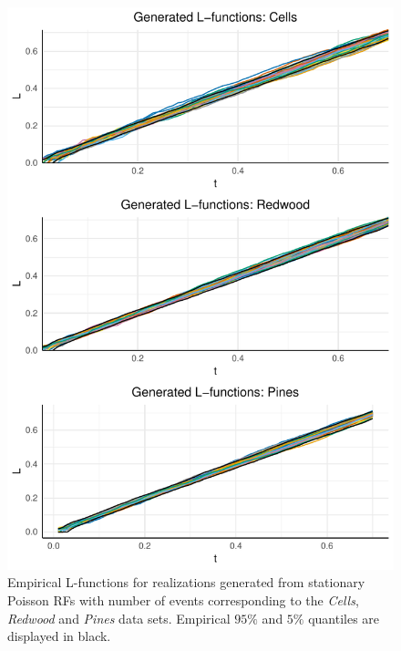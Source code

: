 \begin{figure}
    \centering
    \includegraphics[scale=0.95]{figures/prob1_samples.pdf}
    \caption{Empirical L-functions for realizations generated from stationary Poisson RFs with number of events corresponding to the \textit{Cells}, \textit{Redwood} and \textit{Pines} data sets. Empirical $95\%$ and $5\%$ quantiles are displayed in black.}
    \label{fig:poiss_samps}
\end{figure}

